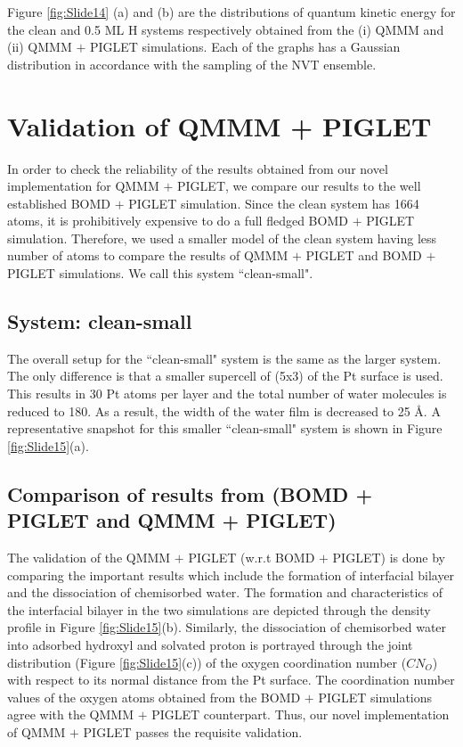 Figure \ref{fig:Slide14} (a) and (b) are the distributions of quantum kinetic energy for the clean and 0.5 ML H systems respectively obtained from the (i) QMMM and (ii) QMMM $+$ PIGLET simulations. Each of the graphs has a Gaussian distribution in accordance with the sampling of the NVT ensemble. 

\section{Validation of QMMM + PIGLET}

In order to check the reliability of the results obtained from our novel implementation for QMMM $+$ PIGLET, we compare our results to the well established BOMD $+$ PIGLET simulation. Since the clean system has 1664 atoms, it is prohibitively expensive to do a full fledged BOMD $+$ PIGLET simulation. Therefore, we used a smaller model of the clean system having less number of atoms to compare the results of  QMMM $+$ PIGLET and BOMD $+$ PIGLET simulations. We call this system ``clean-small".

\subsection{System: clean-small}
The overall setup for the ``clean-small" system is the same as the larger system. The only difference is that a smaller supercell of (5x3) of the Pt surface is used. This results in 30 Pt atoms per layer and the total number of water molecules is reduced to 180. As a result, the width of the water film is decreased to 25 \AA{}. A representative snapshot for this smaller ``clean-small" system is shown in Figure \ref{fig:Slide15}(a).

\subsection{Comparison of results from (BOMD + PIGLET and QMMM + PIGLET)}

The validation of the QMMM $+$ PIGLET (w.r.t BOMD $+$ PIGLET) is done by comparing the important results which include the formation of interfacial bilayer and the dissociation of chemisorbed water. The formation and characteristics of the interfacial bilayer in the two simulations are depicted through the density profile in Figure \ref{fig:Slide15}(b). Similarly, the dissociation of chemisorbed water into adsorbed hydroxyl and solvated proton is portrayed through the joint distribution (Figure \ref{fig:Slide15}(c)) of the oxygen coordination number ($CN_O$) with respect to its normal distance from the Pt surface. The coordination number values of the oxygen atoms obtained from the BOMD $+$ PIGLET simulations agree with the QMMM $+$ PIGLET counterpart. Thus, our novel implementation of QMMM $+$ PIGLET passes the requisite validation. 

